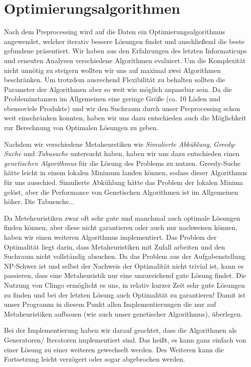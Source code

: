 \section{Optimierungsalgorithmen}

Nach dem Preprocessing wird auf die Daten ein Optimierungsalgorithmus angewendet, welcher iterativ bessere Lösungen findet und anschließend die beste gefundene präsentiert. Wir haben aus den Erfahrungen des letzten Informaticups und erneuten Analysen verschiedene Algorithmen evaluiert. Um die Komplexität nicht unnötig zu steigern wollten wir uns auf maximal zwei Algorithmen beschränken. Um trotzdem ausrechend Flexibilität zu behalten sollten die Parameter der Algorithmen aber so weit wie möglich anpassbar sein. Da die Probleminstanzen im Allgemeinen eine geringe Größe (ca. 10 Läden und ebensoviele Produkte) und wir den Suchraum durch unser Preprocessing schon weit einschränken konnten, haben wir uns dazu entschieden auch die Möglichkeit zur Berechnung von Optimalen Lösungen zu geben. 

Nachdem wir verschiedene Metaheurstiken wie \emph{Simulierte Abkühlung}, \emph{Greedy-Suche} und \emph{Tabusuche} untersucht haben, haben wir uns dazu entschieden einen \emph{genetischen Algorithmus} für die Lösung des Problems zu nutzen. Greedy-Suche hätte leicht in einem lokalen Minimum landen können, sodass dieser Algorithmus für uns ausschied. Simulierte Abkühlung hätte das Problem der lokalen Minima gelöst, aber die Performance von Genetischen Algorithmen ist im Allgemeinen höher. Die Tabusuche...

Da Meteheuristiken zwar oft sehr gute und manchmal auch optimale Lösungen finden können, aber diese nicht garantieren oder auch nur nachweisen können, haben wir einen weiteren Algorithmus implementiert. Das Problem der Optimalität liegt darin, dass Metaheuristiken mit Zufall arbeiten und den Suchraum nicht vollständig absuchen. Da das Problem aus der Aufgabenstellung NP-Schwer ist und selbst der Nachweis der Optimalität nicht trivial ist, kann es passieren, dass eine Metaheuristik nur eine unzureichend gute Lösung findet. Die Nutzung von Clingo ermöglicht es uns, in relativ kurzer Zeit sehr gute Lösungen zu finden und bei der letzten Lösung auch Optimalität zu garantieren! Damit ist unser Programm in diesem Punkt allen Implementierungen die nur auf Metaheuristiken aufbauen (wie auch unser genetischer Algorithmus), überlegen.

Bei der Implementierung haben wir darauf geachtet, dass die Algorithmen als Generatoren/ Iteratoren implementiert sind. Das heißt, es kann ganz einfach von einer Lösung zu einer weiteren gewechselt werden. Des Weiteren kann die Fortsetzung leicht verzögert oder sogar abgebrochen werden.



